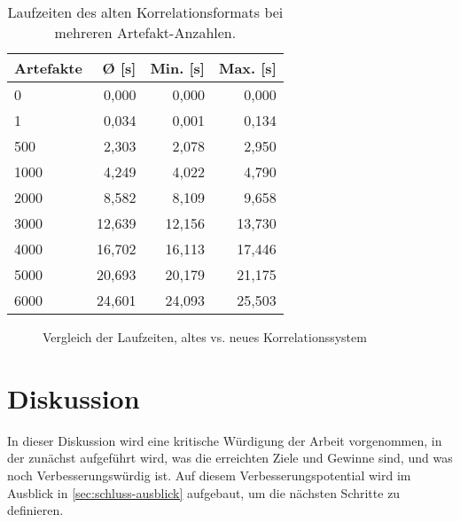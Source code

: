 \begin{table}[h!]
    \centering
    \begin{tabular}{l r r r}
        \toprule
        \textbf{Artefakte} & \textbf{Ø [s]} & \textbf{Min. [s]} & \textbf{Max. [s]} \\
        \midrule
        0                  & 0,000          & 0,000             & 0,000             \\
        1                  & 0,034          & 0,001             & 0,134             \\
        500                & 2,303          & 2,078             & 2,950             \\
        1000               & 4,249          & 4,022             & 4,790             \\
        2000               & 8,582          & 8,109             & 9,658             \\
        3000               & 12,639         & 12,156            & 13,730            \\
        4000               & 16,702         & 16,113            & 17,446            \\
        5000               & 20,693         & 20,179            & 21,175            \\
        6000               & 24,601         & 24,093            & 25,503            \\
        \bottomrule
    \end{tabular}
    \caption{Laufzeiten des alten Korrelationsformats bei mehreren Artefakt-Anzahlen.}
    \label{tab:new-correlation-performance}
\end{table}

\begin{figure}[htbp]
    \centering
    \makebox[\textwidth]{}
    \caption{Vergleich der Laufzeiten, altes vs. neues Korrelationssystem}
    \label{fig:correlation-performance-comparison}
\end{figure}


\section{Diskussion}

In dieser Diskussion wird eine kritische Würdigung der Arbeit vorgenommen, in der zunächst aufgeführt wird, was die erreichten Ziele und Gewinne sind, und was noch Verbesserungswürdig ist.
Auf diesem Verbesserungspotential wird im Ausblick in \autoref{sec:schluss-ausblick} aufgebaut, um die nächsten Schritte zu definieren.


